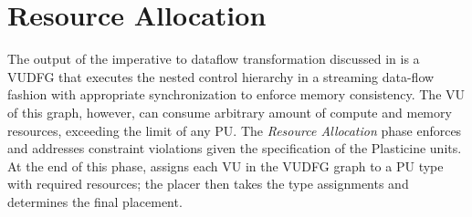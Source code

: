 \section{Resource Allocation} \label{sec:resalloc}

The output of the imperative to dataflow transformation discussed in  is a VUDFG that 
executes the nested control hierarchy in a streaming data-flow fashion with appropriate
synchronization to enforce memory consistency.
The VU of this graph, however, can consume arbitrary amount of compute and memory resources,
exceeding the limit of any PU.
The \emph{Resource Allocation} phase enforces and addresses constraint violations given 
the specification of the Plasticine units. 
At the end of this phase, \name assigns each VU in the VUDFG graph to a PU type with required
resources; the placer then takes the type assignments and determines the final placement.

